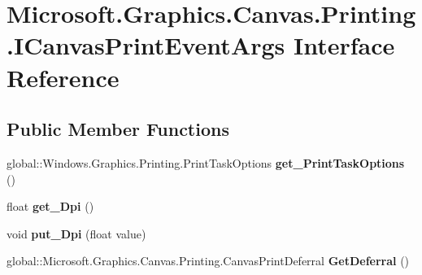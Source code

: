 \hypertarget{interface_microsoft_1_1_graphics_1_1_canvas_1_1_printing_1_1_i_canvas_print_event_args}{}\section{Microsoft.\+Graphics.\+Canvas.\+Printing.\+I\+Canvas\+Print\+Event\+Args Interface Reference}
\label{interface_microsoft_1_1_graphics_1_1_canvas_1_1_printing_1_1_i_canvas_print_event_args}
\subsection*{Public Member Functions}
\begin{DoxyCompactItemize}
\item 
\mbox{\label{interface_microsoft_1_1_graphics_1_1_canvas_1_1_printing_1_1_i_canvas_print_event_args_a71ce18a370233ad4a96b04294e81d699}} 
global\+::\+Windows.\+Graphics.\+Printing.\+Print\+Task\+Options {\bfseries get\+\_\+\+Print\+Task\+Options} ()
\item 
\mbox{\label{interface_microsoft_1_1_graphics_1_1_canvas_1_1_printing_1_1_i_canvas_print_event_args_a904d227a056eff386ed0a743b040faad}} 
float {\bfseries get\+\_\+\+Dpi} ()
\item 
\mbox{\label{interface_microsoft_1_1_graphics_1_1_canvas_1_1_printing_1_1_i_canvas_print_event_args_af46144e28207739e9392d369d6619b02}} 
void {\bfseries put\+\_\+\+Dpi} (float value)
\item 
\mbox{\label{interface_microsoft_1_1_graphics_1_1_canvas_1_1_printing_1_1_i_canvas_print_event_args_ab56989a826e9dc05d710c2959e2bb1a6}} 
global\+::\+Microsoft.\+Graphics.\+Canvas.\+Printing.\+Canvas\+Print\+Deferral {\bfseries Get\+Deferral} ()
\item 
\mbox{\label{interface_microsoft_1_1_graphics_1_1_canvas_1_1_printing_1_1_i_canvas_print_event_args_a638c3a913bba3112ce24903cdff62df6}} 

\end{DoxyCompactItemize}

